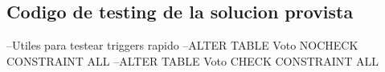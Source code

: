 \subsection{Codigo de testing de la solucion provista}
--Utiles para testear triggers rapido
--ALTER TABLE Voto NOCHECK CONSTRAINT ALL
--ALTER TABLE Voto CHECK CONSTRAINT ALL